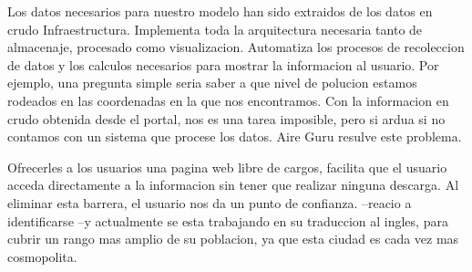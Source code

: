 \begin{itemize}
  \done Los datos necesarios para nuestro modelo han sido extraidos de los datos en crudo
\done Infraestructura. Implementa toda la arquitectura necesaria tanto de almacenaje, procesado como visualizacion.
\done Automatiza los procesos de recoleccion de datos y los calculos necesarios para mostrar la informacion al usuario. Por ejemplo, una pregunta simple 
seria saber a que nivel de polucion estamos rodeados en las coordenadas en la que nos encontramos. Con la informacion en crudo obtenida desde el portal, 
nos es una tarea imposible, pero si ardua si no contamos con un sistema que procese los datos. Aire Guru resulve este problema.
\end{itemize}

Ofrecerles a los usuarios una pagina web libre de cargos, facilita que el usuario acceda directamente a la informacion
sin tener que realizar ninguna descarga. Al eliminar esta barrera, el usuario nos da un punto de confianza.
--reacio a identificarse
--y actualmente se esta trabajando en su traduccion al ingles, para cubrir un rango mas amplio de su poblacion, ya que esta ciudad es cada vez mas cosmopolita.
